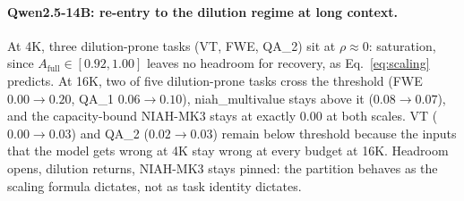 \documentclass{article} %
\begin{document}
\begin{table}[t]
\centering
\caption{Per-input recovery rate $\rho$ on RULER. Bold marks $\rho \ge 0.05$.
NIAH-MK3 (precise multi-key retrieval) is the only task that systematically
fails the threshold in every cell tested. $N = 100$ per (task, cell) except
Qwen-14B ($N = 50$ at 4K, $N = 30$ at 16K), Mistral 16K VT/FWE/QA\_1/NIAH-MK3
($N = 50$), and Qwen-1.5B 16K NIAH-MK3 ($N = 46$). The cell marked ``--''
(QA\_2 at Qwen-3B 16K) was not run.}
\label{tab:partition}
\end{table}

\paragraph{Qwen2.5-14B: re-entry to the dilution regime at long
context.} At 4K, three dilution-prone tasks (VT, FWE, QA\_2) sit at
$\rho \approx 0$: saturation, since $A_{\mathrm{full}} \in [0.92,
1.00]$ leaves no headroom for recovery, as Eq.~\eqref{eq:scaling}
predicts. At 16K, two of five dilution-prone tasks cross the
threshold (FWE $0.00 \to 0.20$, QA\_1 $0.06 \to 0.10$),
niah\_multivalue stays above it ($0.08 \to 0.07$), and the capacity-bound
NIAH-MK3 stays at exactly $0.00$ at both scales. VT ($0.00 \to 0.03$) and QA\_2
($0.02 \to 0.03$) remain below threshold because the inputs that the
model gets wrong at 4K stay wrong at every budget at 16K. Headroom
opens, dilution returns, NIAH-MK3 stays pinned: the partition behaves
as the scaling formula dictates, not as task identity dictates.
\end{document}
